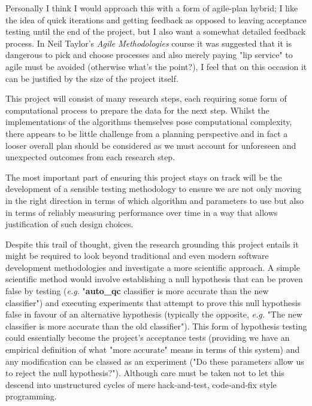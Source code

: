 Personally I think I would approach this with a form of agile-plan hybrid; I
like the idea of quick iterations and getting feedback as opposed to leaving
acceptance testing until the end of the project, but I also want a somewhat
detailed feedback process. In Neil Taylor's \textit{Agile Methodologies} course
it was suggested that it is dangerous to pick and choose processes and also
merely paying "lip service" to agile must be
avoided (otherwise what's the point?), I feel that on this occasion it can be
justified by the size of the project itself.

This project will consist of many research steps, each requiring some form of
computational process to prepare the data for the next step. Whilst the
implementations of the algorithms themselves pose computational complexity,
there appears to be little challenge from a planning perspective and in fact a
looser overall plan should be considered as we must account for unforeseen and
unexpected outcomes from each research step.

The most important part of ensuring this project stays on track will be the
development of a sensible testing methodology to ensure we are not only moving
in the right direction in terms of which algorithm and parameters to use but
also in terms of reliably measuring performance over time in a way that allows
justification of such design choices.

Despite this trail of thought, given the research grounding this project entails
it might be required to look beyond traditional and even modern software
development methodologies and investigate a more scientific approach. A simple
scientific method would involve establishing a null hypothesis that can be
proven false by testing (\textit{e.g.} "\textbf{auto\_qc} classifier is more
accurate than the new classifier") and executing experiments that
attempt to prove this null hypothesis false in favour of an alternative
hypothesis (typically the opposite, \textit{e.g.} "The new classifier is more
accurate than the old classifier"). This form of hypothesis testing
could essentially become the project's acceptance tests (providing we have an
empirical definition of what "more accurate" means in terms of this
system) and any modification can be classed as an experiment ("Do these
parameters allow us to reject the null hypothesis?").  Although care must be
taken not to let this descend into unstructured cycles of mere hack-and-test,
code-and-fix style programming.

